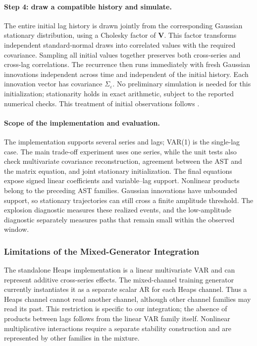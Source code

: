 \paragraph{Step 4: draw a compatible history and simulate.}
The entire initial lag history is drawn jointly from the corresponding
Gaussian stationary distribution, using a Cholesky factor of $\mathbf V$.
This factor transforms independent standard-normal draws into correlated
values with the required covariance. Sampling all initial values together
preserves both cross-series and cross-lag correlations. The recurrence then
runs immediately with fresh Gaussian innovations independent across time
and independent of the initial history. Each innovation vector has covariance
$\Sigma_\varepsilon$. No preliminary simulation is needed for this
initialization; stationarity holds in exact arithmetic, subject to the
reported numerical checks. This treatment of initial observations follows
\citet[Section~4 and Appendix, pp.~8 and 11]{heaps2023stationarity}.

\paragraph{Scope of the implementation and evaluation.}
The implementation supports several series and lags; VAR(1) is the single-lag
case. The main trade-off experiment uses one series, while the unit tests
also check multivariate covariance reconstruction, agreement between the
AST and the matrix equation, and joint stationary initialization. The final
equations expose signed linear coefficients and variable--lag support.
Nonlinear products belong to the preceding AST families. Gaussian innovations
have unbounded support, so stationary trajectories can still cross a finite
amplitude threshold. The explosion diagnostic measures these realized
events, and the low-amplitude diagnostic separately measures paths that
remain small within the observed window.

\subsubsection{Limitations of the Mixed-Generator Integration}
The standalone Heaps implementation is a linear multivariate VAR and can
represent additive cross-series effects. The mixed-channel training generator
currently instantiates it as a separate scalar AR for each Heaps channel.
Thus a Heaps channel cannot read another channel, although other channel
families may read its past. This restriction is specific to our integration;
the absence of products between lags follows from the linear VAR family
itself. Nonlinear multiplicative interactions require a separate stability
construction and are represented by other families in the mixture.

